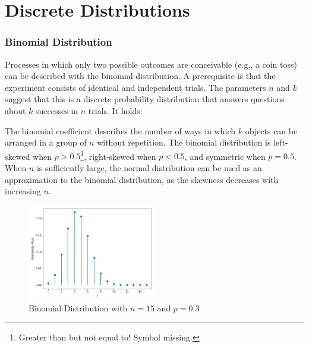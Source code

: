 \section{Discrete Distributions}\label{Discrete Distributions}
\subsubsection{Binomial Distribution}\label{Binomial Distribution}
Processes in which only two possible outcomes are conceivable (e.g., a coin toss) can be described with the binomial distribution. A prerequisite is that the experiment consists of identical and independent trials. The parameters $n$ and $k$ suggest that this is a discrete probability distribution that answers questions about $k$ successes in $n$ trials. It holds:


The binomial coefficient describes the number of ways in which $k$ objects can be arranged in a group of $n$ without repetition. The binomial distribution is left-skewed when $p > 0.5$\footnote{Greater than but not equal to! Symbol missing.}, right-skewed when $p < 0.5$, and symmetric when $p = 0.5$. When $n$ is sufficiently large, the normal distribution can be used as an approximation to the binomial distribution, as the skewness decreases with increasing $n$.

\begin{figure}[h]
    \centering
    \includegraphics[width=0.5\textwidth]{../images/plot_binomial_distribution.png}
    \caption{Binomial Distribution with $n=15$ and $p=0.3$}
    \label{fig:binomial_distribution}
\end{figure}

